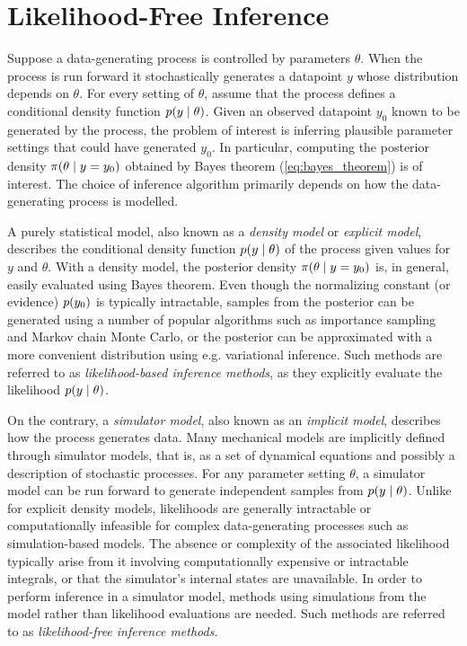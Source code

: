 \chapter{Likelihood-Free Inference}\label{chap:LFI}

Suppose a data-generating process is controlled by parameters $\theta$. When the process is run forward it stochastically generates a datapoint $y$ whose distribution depends on $\theta$. For every setting of $\theta$, assume that the process defines a conditional density function $p \qty(y \mid \theta)$. Given an observed datapoint $y_0$ known to be generated by the process, the problem of interest is inferring plausible parameter settings that could have generated $y_0$. In particular, computing the posterior density $\pi \qty(\theta \mid y=y_0)$ obtained by Bayes theorem (\autoref{eq:bayes_theorem}) is of interest. The choice of inference algorithm primarily depends on how the data-generating process is modelled.

A purely statistical model, also known as a \textit{density model} or \textit{explicit model}, describes the conditional density function $p \qty(y \mid \theta)$ of the process given values for $y$ and $\theta$. With a density model, the posterior density $\pi \qty(\theta \mid y=y_0)$ is, in general, easily evaluated using Bayes theorem. Even though the normalizing constant (or evidence) $p\qty(y_0)$ is typically intractable, samples from the posterior can be generated using a number of popular algorithms such as importance sampling and Markov chain Monte Carlo, or the posterior can be approximated with a more convenient distribution using e.g. variational inference. Such methods are referred to as \textit{likelihood-based inference methods}, as they explicitly evaluate the likelihood $p \qty(y \mid \theta)$.

On the contrary, a \textit{simulator model}, also known as an \textit{implicit model}, describes how the process generates data. Many mechanical models are implicitly defined through simulator models, that is, as a set of dynamical equations and possibly a description of stochastic processes. For any parameter setting $\theta$, a simulator model can be run forward to generate independent samples from $p \qty(y \mid \theta)$. Unlike for explicit density models, likelihoods are generally intractable or computationally infeasible for complex data-generating processes such as simulation-based models. The absence or complexity of the associated likelihood typically arise from it involving computationally expensive or intractable integrals, or that the simulator's internal states are unavailable. In order to perform inference in a simulator model, methods using simulations from the model rather than likelihood evaluations are needed. Such methods are referred to as \textit{likelihood-free inference methods}.

